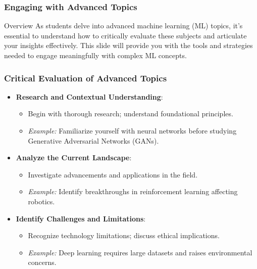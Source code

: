 \documentclass[aspectratio=169]{beamer}
\begin{document}
\begin{frame}[fragile]
    \frametitle{Engaging with Advanced Topics}
    \begin{block}{Overview}
        As students delve into advanced machine learning (ML) topics, it's essential to understand how to critically evaluate these subjects and articulate your insights effectively. This slide will provide you with the tools and strategies needed to engage meaningfully with complex ML concepts.
    \end{block}
\end{frame}

\begin{frame}[fragile]
    \frametitle{Critical Evaluation of Advanced Topics}
    \begin{itemize}
        \item \textbf{Research and Contextual Understanding}:
            \begin{itemize}
                \item Begin with thorough research; understand foundational principles.
                \item \textit{Example:} Familiarize yourself with neural networks before studying Generative Adversarial Networks (GANs).
            \end{itemize}
        
        \item \textbf{Analyze the Current Landscape}:
            \begin{itemize}
                \item Investigate advancements and applications in the field.
                \item \textit{Example:} Identify breakthroughs in reinforcement learning affecting robotics.
            \end{itemize}
        
        \item \textbf{Identify Challenges and Limitations}:
            \begin{itemize}
                \item Recognize technology limitations; discuss ethical implications.
                \item \textit{Example:} Deep learning requires large datasets and raises environmental concerns.
            \end{itemize}
    \end{itemize}
\end{frame}
\end{document}
